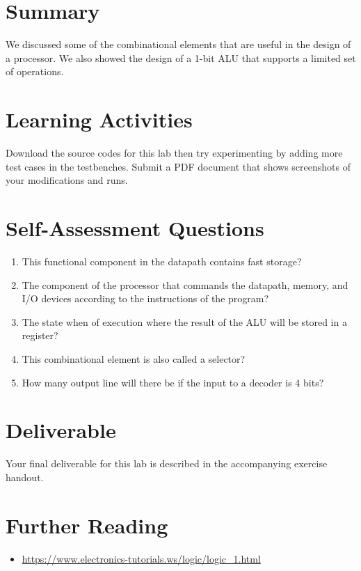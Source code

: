 \documentclass[a4paper, 11pt,oneside]{article}
\begin{document}
\section{Summary}
We discussed some of the combinational elements that are useful in the design of a processor. We also showed the design of a 1-bit ALU that supports a limited set of operations.

\section{Learning Activities}
Download the source codes for this lab then try experimenting by adding more test cases in the testbenches. Submit a PDF document that shows screenshots of your modifications and runs.

\section{Self-Assessment Questions}
\begin{enumerate}
\item This functional component in the datapath contains fast storage?
\item The component of the processor that commands the datapath, memory, and 
I/O devices according to the instructions of the program? 
\item The state when of execution where the result of the ALU will be stored 
in a register?
\item This combinational element is also called a selector?
\item How many output line will there be if the input to a decoder is 4 bits?
\end{enumerate}

\section{Deliverable}
Your final deliverable for this lab is described in the accompanying exercise handout.

\section{Further Reading}
\begin{itemize}
\item 
\href{https://www.electronics-tutorials.ws/logic/logic\_1.html}
{https://www.electronics-tutorials.ws/logic/logic\_1.html}
\end{itemize}




\nocite{*}
\end{document}
